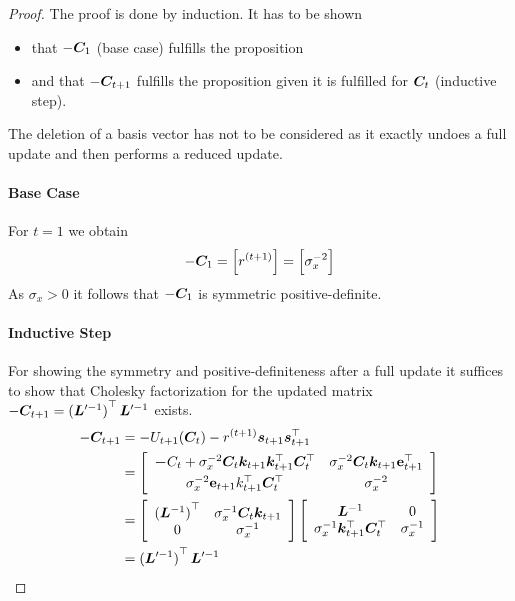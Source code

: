 \begin{proof}
    The proof is done by induction. It has to be shown
    \begin{itemize}
        \item that $-\bm{C}_1$ (base case) fulfills the proposition
        \item and that $-\bm{C}_{t+1}$ fulfills the proposition given it is 
            fulfilled for $\bm{C}_t$ (inductive step).
    \end{itemize}
    The deletion of a basis vector has not to be considered as it exactly undoes 
    a full update and then performs a reduced update.

    \paragraph{Base Case}
    For $t = 1$ we obtain
    \begin{equation*}
        -\mat C_1 = \sbr{r^{(t+1)}} = \sbr{\sigma_x^{-2}}
    \end{equation*}
    As $\sigma_x > 0$ it follows that $-\bm{C}_1$ is symmetric positive-definite.

    \paragraph{Inductive Step}
    For showing the symmetry and positive-definiteness after a full update it 
    suffices to show that Cholesky factorization for the updated matrix $-\mat 
    C_{t+1} = \del[0]{\mat L'^{-1}}\Tr \mat L'^{-1}$ exists.
\begin{align*}
    -\mat C_{t+1} &= -U_{t+1}(\mat C_t) - r^{(t+1)} \vc s_{t+1} \vc s_{t+1}\Tr 
    \\
        &= \sbr{\begin{array}{cc}
                \mat -C_t + \sigma_x^{-2} \mat C_t \vc k_{t+1} \vc k_{t+1}\Tr 
                \mat C_t\Tr & \sigma_x^{-2} \mat C_t \vc k_{t+1} \vc\e_{t+1}\Tr 
                \\[\smallskipamount]
                \sigma_x^{-2} \vc\e_{t+1} k_{t+1}\Tr \mat C_t\Tr & \sigma_x^{-2}
            \end{array}} \\
        &= \sbr{\begin{array}{cc}
                \del[0]{\mat L^{-1}}\Tr & \sigma_x^{-1} \mat C_t \vc k_{t+1} \\
                0 & \sigma_x^{-1}
            \end{array}} \sbr{\begin{array}{cc}
                \mat L^{-1} & 0 \\
                \sigma_x^{-1} \vc k_{t+1}\Tr \mat C_t\Tr & \sigma_x^{-1}
            \end{array}} \\
        &= \del[0]{\mat L'^{-1}}\Tr \mat L'^{-1}
    \end{align*}


\end{proof}
